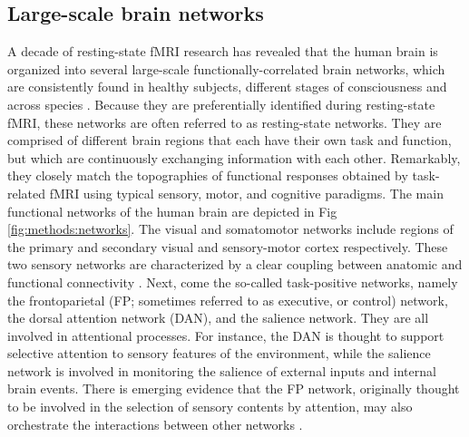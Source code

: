 \subsection{Large-scale brain networks}
\label{sec:fmri:fc:network}

A decade of resting-state fMRI research has revealed that the human brain is organized into several large-scale functionally-correlated brain networks, which are consistently found in healthy subjects, different stages of consciousness and across species \citep{fox_spontaneous_2007, yeo_organization_2011}. Because they are preferentially identified during resting-state fMRI, these networks are often referred to as resting-state networks. They are comprised of different brain regions that each have their own task and function, but which are continuously exchanging information with each other. Remarkably, they closely match the topographies of functional responses obtained by task-related fMRI using typical sensory, motor, and cognitive paradigms.
The main functional networks of the human brain are depicted in Fig \ref{fig:methods:networks}. The visual and somatomotor networks include regions of the primary and secondary visual and sensory-motor cortex respectively. These two sensory networks are characterized by a clear coupling between anatomic and functional connectivity \citep{van_dijk_intrinsic_2010}. Next, come the so-called task-positive networks, namely the frontoparietal (FP; sometimes referred to as executive, or control) network, the dorsal attention network (DAN), and the salience network. They are all involved in attentional processes. For instance, the DAN is thought to support selective attention to sensory features of the environment, while the salience network is involved in monitoring the salience of external inputs and internal brain events. There is emerging evidence that the FP network, originally thought to be involved in the selection of sensory contents by attention, may also orchestrate the interactions between other networks \citep{christoff_mind-wandering_2016}.

